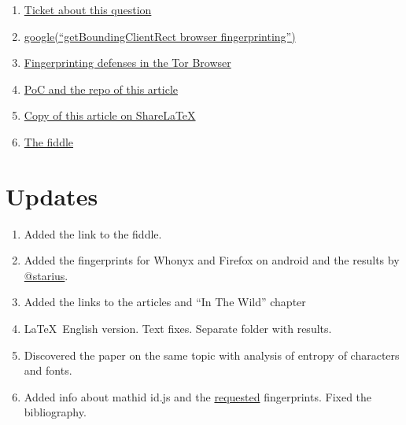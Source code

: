 \documentclass[letterpaper,14pt]{article}
\begin{document}
\begin{enumerate}
\itemsep1pt\parskip0pt
\item
  \href{https://trac.torproject.org/projects/tor/ticket/13400}{Ticket about this question}
\item
  \href{https://www.google.com/search?num=100\&newwindow=1\&q=getBoundingClientRect+browser+fingerprinting}{google(``getBoundingClientRect browser fingerprinting'')}
\item
  \href{https://www.torproject.org/projects/torbrowser/design/\#fingerprinting-defenses}{Fingerprinting defenses in the Tor Browser}
\item
  \href{https://github.com/KOLANICH/Article-2015-Dull-captaincy-or-the-way-Tor-Project-fights-browser-fingerprinting}{PoC and the repo of this article}
\item
  \href{https://www.sharelatex.com/github/repos/KOLANICH/Article-2015-Dull-captaincy-or-the-way-Tor-Project-fights-browser-fingerprinting}{Copy of this article on Share\LaTeX}
\item
  \href{http://jsfiddle.net/fyw4qmdg/5/}{The fiddle}
\end{enumerate}

\nocite{*}
\printbibliography[heading=bibnumbered]


\section{Updates}\label{updates}
\begin{enumerate}
\itemsep1pt\parskip0pt
\item
  Added the link to the fiddle.
\item
  Added the fingerprints for Whonyx and Firefox on android and the
  results by \href{https://geektimes.ru/users/starius/}{@starius}.
\item
  Added the links to the articles and ``In The Wild'' chapter
\item
   \LaTeX\ English version. Text fixes. Separate folder with results.
\item
   Discovered the paper\cite{Fifield2015} on the same topic with analysis of entropy of characters and fonts.
\item
   Added info about mathid id.js and the \href{https://trac.torproject.org/projects/tor/ticket/13400#comment:12}{requested} fingerprints. Fixed the bibliography.
\end{enumerate}


{\footnotesize}
\appendix
\end{document}

